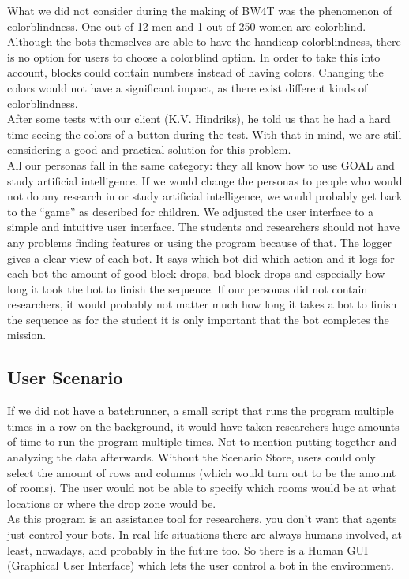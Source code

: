 What we did not consider during the making of BW4T was the phenomenon of colorblindness. One out of 12 men and 1 out of 250 women are colorblind. Although the bots themselves are able to have the handicap colorblindness, there is no option for users to choose a colorblind option. In order to take this into account, blocks could contain numbers instead of having colors. Changing the colors would not have a significant impact, as there exist different kinds of colorblindness. \\

After some tests with our client (K.V. Hindriks), he told us that he had a hard time seeing the colors of a button during the test. With that in mind, we are still considering a good and practical solution for this problem.\\


All our personas fall in the same category: they all know how to use GOAL and study artificial intelligence. If we would change the personas to people who would not do any research in or study artificial intelligence, we would probably get back to the “game” as described for children. We adjusted the user interface to a simple and intuitive user interface. The students and researchers should not have any problems finding features or using the program because of that. The logger gives a clear view of each bot. It says which bot did which action and it logs for each bot the amount of good block drops, bad block drops and especially how long it took the bot to finish the sequence. If our personas did not contain researchers, it would probably not matter much how long it takes a bot to finish the sequence as for the student it is only important that the bot completes the mission.

\subsection*{User Scenario}
If we did not have a batchrunner, a small script that runs the program multiple times in a row on the background, it would have taken researchers huge amounts of time to run the program multiple times. Not to mention putting together and analyzing the data afterwards. Without the Scenario Store, users could only select the amount of rows and columns (which would turn out to be the amount of rooms). The user would not be able to specify which rooms would be at what locations or where the drop zone would be. \\

As this program is an assistance tool for researchers, you don't want that agents just control your bots. In real life situations there are always humans involved, at least, nowadays, and probably in the future too. So there is a Human GUI (Graphical User Interface) which lets the user control a bot in the environment. \\

